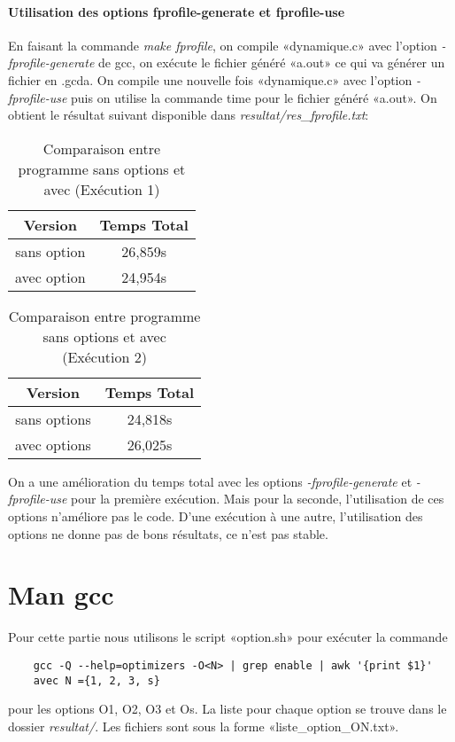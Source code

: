 \documentclass{rapport}
\begin{document}
\subsection{Utilisation des options fprofile-generate et fprofile-use}
En faisant la commande \textit{make fprofile}, on compile «dynamique.c» avec l'option \textit{-fprofile-generate} de gcc, on exécute le fichier généré «a.out» ce qui va générer un fichier en .gcda. On compile une nouvelle fois «dynamique.c» avec l'option \textit{-fprofile-use} puis on utilise la commande time pour le fichier généré «a.out».
\newline
On obtient le résultat suivant disponible dans \textit{resultat/res\_fprofile.txt}:
\begin{table}[h!]
    \centering
    \begin{tabular}{|c|c|}
        \hline
        Version & Temps Total \\
        \hline
        sans option & 26,859s \\
        \hline
        avec option &  24,954s\\
        \hline
    \end{tabular}
    \caption{Comparaison entre programme sans options et avec (Exécution 1)}
    \label{tab:graph_characteristics_1}
\end{table}
\begin{table}[h!]
    \centering
    \begin{tabular}{|c|c|}
        \hline
        Version & Temps Total \\
        \hline
        sans options & 24,818s \\
        \hline
        avec options &  26,025s \\
        \hline
    \end{tabular}
    \caption{Comparaison entre programme sans options et avec (Exécution 2)}
    \label{tab:graph_characteristics_1}
\end{table}
On a une amélioration du temps total avec les options \textit{-fprofile-generate} et \textit{-fprofile-use} pour la première exécution. Mais pour la seconde, l'utilisation de ces options n'améliore pas le code. D'une exécution à une autre, l'utilisation des options ne donne pas de bons résultats, ce n'est pas stable.
\clearpage
\part{Man gcc}
Pour cette partie nous utilisons le script «option.sh» pour exécuter la commande
\begin{lstlisting}
    gcc -Q --help=optimizers -O<N> | grep enable | awk '{print $1}'
    avec N ={1, 2, 3, s}
\end{lstlisting}
pour les options O1, O2, O3 et Os. La liste pour chaque option se trouve dans le dossier \textit{resultat/}. Les fichiers sont sous la forme «liste\_option\_ON.txt».
\end{document}
